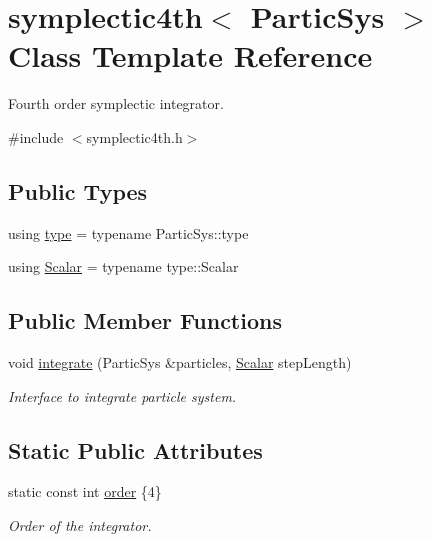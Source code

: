 \hypertarget{classsymplectic4th}{}\section{symplectic4th$<$ Partic\+Sys $>$ Class Template Reference}
\label{classsymplectic4th}


Fourth order symplectic integrator.  




{\ttfamily \#include $<$symplectic4th.\+h$>$}

\subsection*{Public Types}
\begin{DoxyCompactItemize}
\item 
using \mbox{\hyperlink{classsymplectic4th_a5af1033b30e95ca0d08ee8f3c0adabc2}{type}} = typename Partic\+Sys\+::type
\item 
using \mbox{\hyperlink{classsymplectic4th_a272a5a2bb16a90a7ebdad0335a2fac9b}{Scalar}} = typename type\+::\+Scalar
\end{DoxyCompactItemize}
\subsection*{Public Member Functions}
\begin{DoxyCompactItemize}
\item 
void \mbox{\hyperlink{classsymplectic4th_a4ec2375bddd7b3cdff6c675e14a08fe0}{integrate}} (Partic\+Sys \&particles, \mbox{\hyperlink{classsymplectic4th_a272a5a2bb16a90a7ebdad0335a2fac9b}{Scalar}} step\+Length)
\begin{DoxyCompactList}\small\item\em Interface to integrate particle system. \end{DoxyCompactList}\end{DoxyCompactItemize}
\subsection*{Static Public Attributes}
\begin{DoxyCompactItemize}
\item 
static const int \mbox{\hyperlink{classsymplectic4th_a44427b7e9dab1a2241071d1cc639ebe4}{order}} \{4\}
\begin{DoxyCompactList}\small\item\em Order of the integrator. \end{DoxyCompactList}\end{DoxyCompactItemize}



